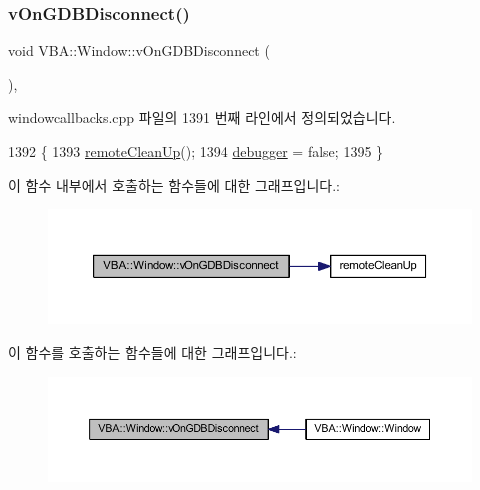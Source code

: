 \subsubsection{\texorpdfstring{v\+On\+G\+D\+B\+Disconnect()}{vOnGDBDisconnect()}}
{\footnotesize\ttfamily void V\+B\+A\+::\+Window\+::v\+On\+G\+D\+B\+Disconnect (\begin{DoxyParamCaption}{ }\end{DoxyParamCaption})\hspace{0.3cm}{\ttfamily [protected]}, {\ttfamily [virtual]}}



windowcallbacks.\+cpp 파일의 1391 번째 라인에서 정의되었습니다.


\begin{DoxyCode}
1392 \{
1393   \mbox{\hyperlink{windowcallbacks_8cpp_ad472decd8f1a11c276d8bfb3740bd8ec}{remoteCleanUp}}();
1394   \mbox{\hyperlink{windowcallbacks_8cpp_af67e2df4c66ef114f4edb85c06810007}{debugger}} = \textcolor{keyword}{false};
1395 \}
\end{DoxyCode}
이 함수 내부에서 호출하는 함수들에 대한 그래프입니다.\+:
\nopagebreak
\begin{figure}[H]
\begin{center}
\leavevmode
\includegraphics[width=350pt]{class_v_b_a_1_1_window_ad6f454f394ed7265f374e78b2a255cbb_cgraph}
\end{center}
\end{figure}
이 함수를 호출하는 함수들에 대한 그래프입니다.\+:
\nopagebreak
\begin{figure}[H]
\begin{center}
\leavevmode
\includegraphics[width=350pt]{class_v_b_a_1_1_window_ad6f454f394ed7265f374e78b2a255cbb_icgraph}
\end{center}
\end{figure}
\mbox{\label{class_v_b_a_1_1_window_a266811d22fbeb400a01d1c2330fb9877}} 
